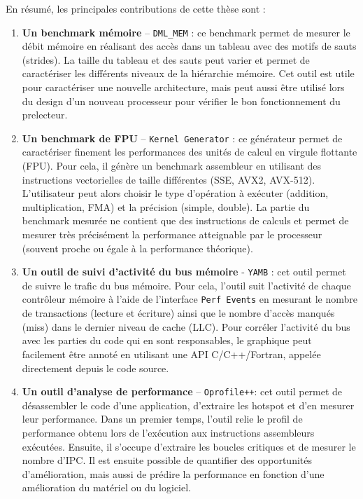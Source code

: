         
        En résumé, les principales contributions de cette thèse sont :
        \begin{enumerate}

            \item \textbf{Un benchmark mémoire} – \verb=DML_MEM= : ce benchmark permet de mesurer le débit mémoire en réalisant des accès dans un tableau avec des motifs de sauts (strides). La taille du tableau et des sauts peut varier et permet de caractériser les différents niveaux de la hiérarchie mémoire. Cet outil est utile pour caractériser une nouvelle architecture, mais peut aussi être utilisé lors du design d'un nouveau processeur pour vérifier le bon fonctionnement du \gls{prelecteur}.
            
            \item \textbf{Un benchmark de FPU} – \verb|Kernel Generator| : ce générateur permet de caractériser finement les performances des unités de calcul en virgule flottante (FPU). Pour cela, il génère un benchmark assembleur en utilisant des instructions vectorielles de taille différentes (SSE, AVX2, AVX-512). L'utilisateur peut alors choisir le type d'opération à exécuter (addition, multiplication, FMA) et la précision (simple, double). La partie du benchmark mesurée ne contient que des instructions de calculs et permet de mesurer très précisément la performance atteignable par le processeur (souvent proche ou égale à la performance théorique).
                        
            \item \textbf{Un outil de suivi d'activité du bus mémoire} -  \verb=YAMB= : cet outil  permet de suivre le trafic du bus mémoire. Pour cela, l'outil suit l'activité de chaque contrôleur mémoire à l'aide de l'interface \verb=Perf Events= en mesurant le nombre de transactions (lecture et écriture) ainsi que le nombre d'accès manqués (miss) dans le dernier niveau de cache (LLC). Pour corréler l'activité du bus avec les parties du code qui en sont responsables, le graphique peut facilement être annoté en utilisant une API C/C++/Fortran, appelée directement depuis le code source.
            
            \item \textbf{Un outil d'analyse de performance} – \verb=Oprofile++=: cet outil permet de désassembler le code d'une application, d'extraire les \gls{hotspot} et d'en mesurer leur performance. Dans un premier temps, l'outil  relie le profil de performance obtenu lors de l'exécution aux instructions assembleurs exécutées. Ensuite, il s'occupe d'extraire les boucles critiques et de mesurer le nombre d'\gls{IPC}. Il est ensuite possible de quantifier des opportunités d'amélioration, mais aussi de prédire la performance en fonction d'une amélioration du matériel ou du logiciel.
            
        \end{enumerate}
        
